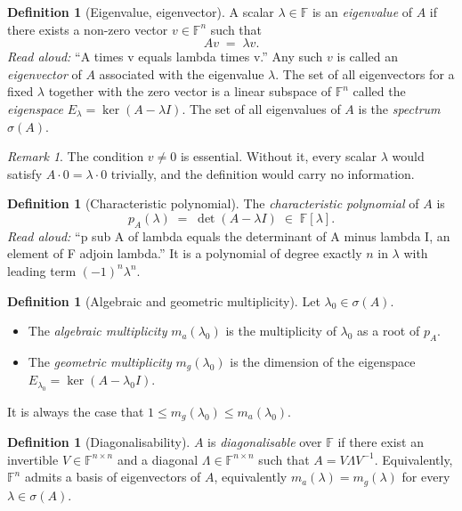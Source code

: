 \documentclass[11pt]{article}
\theoremstyle{definition}
\newtheorem{definition}[theorem]{Definition}
\theoremstyle{remark}
\newtheorem*{remark}{Remark}
\newcommand{\F}{\mathbb{F}}
\begin{document}
\begin{definition}[Eigenvalue, eigenvector]
A scalar $\lambda \in \F$ is an \emph{eigenvalue} of $A$ if there exists a
non-zero vector $v \in \F^{n}$ such that
\[
  A v \;=\; \lambda v.
\]
\emph{Read aloud:} ``A times v equals lambda times v.''
Any such $v$ is called an \emph{eigenvector} of $A$ associated with the
eigenvalue $\lambda$. The set of all eigenvectors for a fixed $\lambda$
together with the zero vector is a linear subspace of $\F^{n}$ called the
\emph{eigenspace} $E_\lambda = \ker(A - \lambda I)$. The set of all
eigenvalues of $A$ is the \emph{spectrum} $\sigma(A)$.
\end{definition}

\begin{remark}
The condition $v \ne 0$ is essential. Without it, every scalar $\lambda$
would satisfy $A \cdot 0 = \lambda \cdot 0$ trivially, and the definition
would carry no information.
\end{remark}

\begin{definition}[Characteristic polynomial]
The \emph{characteristic polynomial} of $A$ is
\[
  p_A(\lambda) \;=\; \det(A - \lambda I) \;\in\; \F[\lambda].
\]
\emph{Read aloud:} ``p sub A of lambda equals the determinant of A minus lambda I, an element of F adjoin lambda.''
It is a polynomial of degree exactly $n$ in $\lambda$ with leading term
$(-1)^{n} \lambda^{n}$.
\end{definition}

\begin{definition}[Algebraic and geometric multiplicity]
Let $\lambda_0 \in \sigma(A)$.
\begin{itemize}
  \item The \emph{algebraic multiplicity} $m_a(\lambda_0)$ is the
    multiplicity of $\lambda_0$ as a root of $p_A$.
  \item The \emph{geometric multiplicity} $m_g(\lambda_0)$ is the
    dimension of the eigenspace $E_{\lambda_0} = \ker(A - \lambda_0 I)$.
\end{itemize}
It is always the case that $1 \le m_g(\lambda_0) \le m_a(\lambda_0)$.
\end{definition}

\begin{definition}[Diagonalisability]
$A$ is \emph{diagonalisable} over $\F$ if there exist an invertible
$V \in \F^{n \times n}$ and a diagonal $\Lambda \in \F^{n\times n}$ such
that $A = V \Lambda V^{-1}$. Equivalently, $\F^{n}$ admits a basis of
eigenvectors of $A$, equivalently $m_a(\lambda) = m_g(\lambda)$ for every
$\lambda \in \sigma(A)$.
\end{definition}
\end{document}
